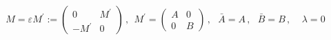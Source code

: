 \begin{equation}
M=\varepsilon M^{\prime }:=\left( 
\begin{array}{cc}
0 & M^{\prime } \\ 
-M^{\prime } & 0
\end{array}
\right) \,,~~M^{\prime }=\left( 
\begin{array}{cc}
A & 0 \\ 
0 & B
\end{array}
\right) \,,~~~\bar{A}=A\,,~~~\bar{B}=B\,,~~~~~\lambda =0  \label{single}
\end{equation}

